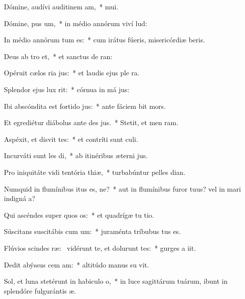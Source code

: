 \item Dómine, audívi auditinem am,~*  mui.
\item Dómine, pus um,~* in médio annórum viví lud:
\item In médio annórum tum es:~* cum irátus fúeris, misericórdiæ beris.
\item Deus ab tro et,~* et sanctus de  ran:
\item Opéruit cælos ria jus:~* et laudis ejus ple  ra.
\item Splendor ejus  lux rit:~* córnua in má jus:
\item Ibi abscóndita est fortido jus:~* ante fáciem  bit mors.
\item Et egrediétur diábolus ante des jus.~* Stetit, et men  ram.
\item Aspéxit, et disvit tes:~* et contríti sunt  culi.
\item Incurváti sunt les di,~* ab itinéribus æterni jus.
\item Pro iniquitáte vidi tentória thiæ,~* turbabúntur pelles  dian.
\item Numquid in flumínibus itus es, ne?~* aut in flumínibus furor tuus? vel in mari indigná a?
\item Qui ascéndes super quos os:~* et quadrígæ tu tio.
\item Súscitans suscitábis cum um:~* juraménta tríbubus  tus es.
\item Flúvios scindes ræ:~\pscross{} vidérunt te, et dolurunt tes:~* gurges a iit.
\item Dedit abýssus cem am:~* altitúdo manus su vit.
\item Sol, et luna stetérunt in habiculo o,~* in luce sagittárum tuárum, ibunt in splendóre fulgurántis  æ.
